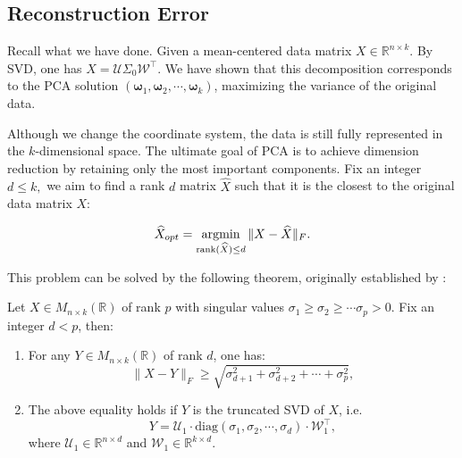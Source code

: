 \documentclass[12pt]{article}
\begin{document}
\subsection{Reconstruction Error}

Recall what we have done. Given a mean-centered data matrix $X \in \mathbb{R}^{n \times k}$. By SVD, one has $X=\mathcal{U}\Sigma_0\mathcal{W}^\top$.
We have shown that this decomposition corresponds to the PCA solution $(\boldsymbol{\omega}_1,\boldsymbol{\omega}_2,\cdots,\boldsymbol{\omega}_k)$, maximizing the variance of the original data. 

Although we change the coordinate system, the data is still fully represented in the $k$-dimensional space. The ultimate goal of PCA is to achieve dimension reduction by retaining only the most important components.
Fix an integer $d\le k,$ we aim to find a rank $d$ matrix $\widehat{X}$ such that it is the closest to the original data matrix $X$:

\[
\widehat{X}_{opt} = \underset{\operatorname{rank}(\widehat{X}) \le d}{\operatorname*{argmin}} \, \|X - \widehat{X}\|_F.
\]

This problem can be solved by the following theorem, originally established by \citet{eckart1936approximation}:
\begin{thmbox}
    Let $X\in M_{n\times k}(\mathbb{R})$ of rank $p$ with singular values $\sigma_1\ge\sigma_2\ge\cdots\sigma_p>0.$
    Fix an integer $d<p$, then:
    \begin{enumerate}
        \item For any $Y\in M_{n\times k}(\mathbb{R})$ of rank $d$, one has:
        \[\|X-Y\|_F\ge\sqrt{\sigma^2_{d+1} + \sigma^2_{d+2}+\cdots+\sigma^2_{p}},\]
        \item The above equality holds if $Y$ is the truncated SVD of $X$, i.e.
        $$Y=\mathcal{U}_1\cdot \text{diag}(\sigma_1, \sigma_2,\cdots,\sigma_d)\cdot\mathcal{W}_1^\top,$$
        where $\mathcal{U}_1\in\mathbb{R}^{n\times d}$ and $\mathcal{W}_1\in\mathbb{R}^{k\times d}$.
    \end{enumerate}
\end{thmbox}
\end{document}
